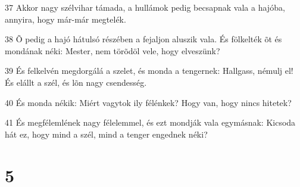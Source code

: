 \par 37 Akkor nagy szélvihar támada, a hullámok pedig becsapnak vala a hajóba, annyira, hogy már-már megtelék.
\par 38 Õ pedig a hajó hátulsó részében a fejaljon aluszik vala. És fölkelték õt és mondának néki: Mester, nem törõdöl vele, hogy elveszünk?
\par 39 És felkelvén megdorgálá a szelet, és monda a tengernek: Hallgass, némulj el! És elállt a szél, és lõn nagy csendesség.
\par 40 És monda nékik: Miért vagytok ily félénkek? Hogy van, hogy nincs hitetek?
\par 41 És megfélemlének nagy félelemmel, és ezt mondják vala egymásnak: Kicsoda hát ez, hogy mind a szél, mind a tenger engednek néki?

\chapter{5}

